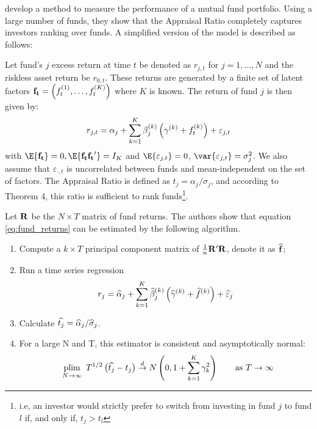 \citet{connor1986performance} develop a method to measure the performance of a mutual fund portfolio. Using a large number of funds, they show that the \citet{treynor1973use} Appraisal Ratio completely captures investors ranking over funds. A simplified version of the model is described as follows:

Let fund's \(j\) excess return at time \(t\) be denoted as \(r_{j,t}\) for \(j = 1, \dots, N\) and the riskless asset return be \(r_{0,t}\). These returns are generated by a finite set of latent factors \(\mathbf{f_t} = \left( f_t^{(1)}, \dots, f_t^{(K)} \right)\) where \(K\) is known. The return of fund \(j\) is then given by:
\begin{equation}
    \label{eq:fund_returns}
    r_{j,t} = \alpha_j + \sum_{k = 1}^K\beta_j^{(k)}\left( \gamma^{(k)} + f_t^{(k)} \right)    + \varepsilon_{j,t}
\end{equation}
with \(\E{\bf{f_t}} = 0, \E{\bf{f_tf_t}^\prime} = I_K\) and \(\E{\varepsilon_{j,t}} = 0\), \(\var{\varepsilon_{j,t}} = \sigma_j^2\). We also assume that \(\varepsilon_{\cdot, t}\) is uncorrelated between funds and mean-independent on the set of factors.  
The Appraisal Ratio is defined as \(t_j = \alpha_j / \sigma_j\), and according to Theorem 4, this ratio is sufficient to rank funds\footnote{i.e, an investor would strictly prefer to switch from investing in fund \(j\) to fund \(l\) if, and only if, \(t_j > t_l\)}.

Let \(\bf{R}\) be the \(N \times T\) matrix of fund returns. The authors show that equation \eqref{eq:fund_returns} can be estimated by the following algorithm.
\begin{enumerate}[label = \arabic*), leftmargin = *]
    \item Compute a \(k \times T\) principal component matrix of \(\frac{1}{n} \bf{R}^\prime \bf{R}\), denote it as \(\widehat{\bf{f}}\);
    \item Run a time series regression 
    \begin{equation}
        \label{eq:ck_regression}
        r_j = \widehat{\alpha}_j + \sum_{k = 1}^K\widehat{\beta}_j^{(k)}\left( \widehat{\gamma}^{(k)} + \widehat{f}^{(k)} \right) + \widehat{\varepsilon}_j
    \end{equation}
    \item Calculate \(\widehat{t_j} = \widehat{\alpha}_j / \widehat{\sigma}_j\).
    \item For a large N and T, this estimator is consistent and asymptotically normal:
    \begin{equation}
        \label{eq:appraisal_distribution}
        \hspace{5pt}\underset{N \to \infty}{\text{plim}}\hspace{5pt} T^{1/2}\left( \widehat{t_j} - t_j \right) \overset{d}{\to} N\left( 0, 1 + \sum_{k=1}^K \gamma_k^2 \right) \qquad \text{as } T \to \infty
    \end{equation}
\end{enumerate}

